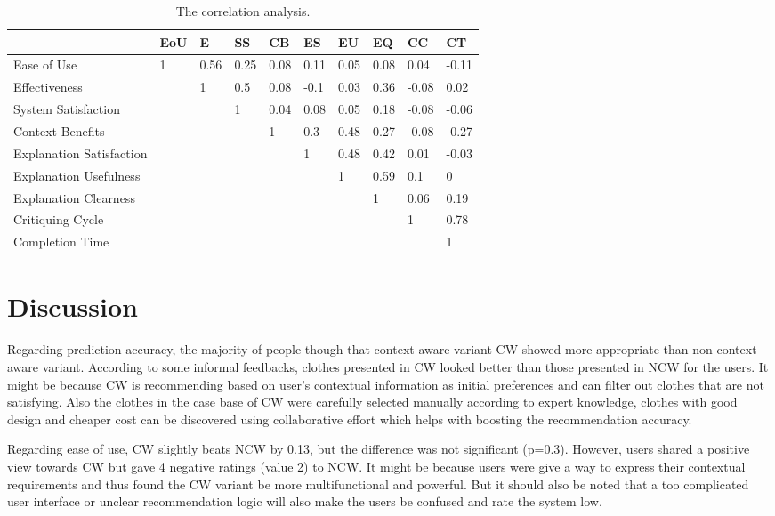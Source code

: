 \begin{table}[H]
	\centering
	\caption{The correlation analysis.}
	\label{tab:correlation}
	\begin{tabular}{p{0.9in}p{0.35in}p{0.35in}p{0.35in}p{0.35in}p{0.35in}p{0.35in}p{0.35in}p{0.35in}p{0.35in}}
		 & EoU & E & SS & CB & ES & EU & EQ & CC & CT \\ \hline
		Ease of Use & 1 & 0.56 & 0.25 & 0.08 & 0.11 & 0.05 & 0.08 & 0.04 & -0.11 \\
		Effectiveness &  & 1 & 0.5 & 0.08 & -0.1 & 0.03 & 0.36 & -0.08 & 0.02 \\
		System Satisfaction &  &  & 1 & 0.04 & 0.08 & 0.05 & 0.18 & -0.08 & -0.06 \\
		Context Benefits &  &  &  & 1 & 0.3 & 0.48 & 0.27 & -0.08 & -0.27 \\
		Explanation Satisfaction &  &  &  &  & 1 & 0.48 & 0.42 & 0.01 & -0.03 \\
		Explanation Usefulness &  &  &  &  &  & 1 & 0.59 & 0.1 & 0 \\
		Explanation Clearness &  &  &  &  &  &  & 1 & 0.06 & 0.19 \\
		Critiquing Cycle &  &  &  &  &  &  &  & 1 & 0.78 \\
		Completion Time &  &  &  &  &  &  &  &  & 1 \\ \hline
	\end{tabular}
\end{table}

\section{Discussion} \label{sec:discussion}

Regarding prediction accuracy, the majority of people though that context-aware variant CW showed more appropriate than non context-aware variant. According to some informal feedbacks, clothes presented in CW looked better than those presented in NCW for the users. It might be because CW is recommending based on user's contextual information as initial preferences and can filter out clothes that are not satisfying. Also the clothes in the case base of CW were carefully selected manually according to expert knowledge, clothes with good design and cheaper cost can be discovered using collaborative effort which helps with boosting the recommendation accuracy.

Regarding ease of use, CW slightly beats NCW by 0.13, but the difference was not significant (p=0.3). However, users shared a positive view towards CW but gave 4 negative ratings (value 2) to NCW. It might be because users were give a way to express their contextual requirements and thus found the CW variant be more multifunctional and powerful. But it should also be noted that a too complicated user interface or unclear recommendation logic will also make the users be confused and rate the system low.


